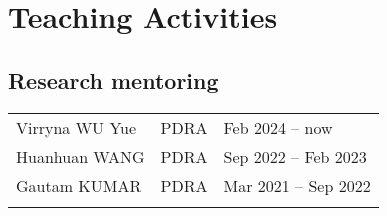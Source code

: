 \documentclass[letterpaper]{article}
\renewenvironment{itemize}{
  \begin{list}{}{
    \setlength{\leftmargin}{1.5em}
  }
}{
  \end{list}
}
\begin{document}






\section*{Teaching Activities}

\subsection*{Research mentoring}

\begin{tabularx}{\textwidth}{XXX}
  Virryna WU Yue          & PDRA  & Feb 2024 -- now\\
  Huanhuan WANG           & PDRA  & Sep 2022 -- Feb 2023\\
  Gautam KUMAR            & PDRA  & Mar 2021 -- Sep 2022\\
  \\
\end{tabularx}
\end{document}
